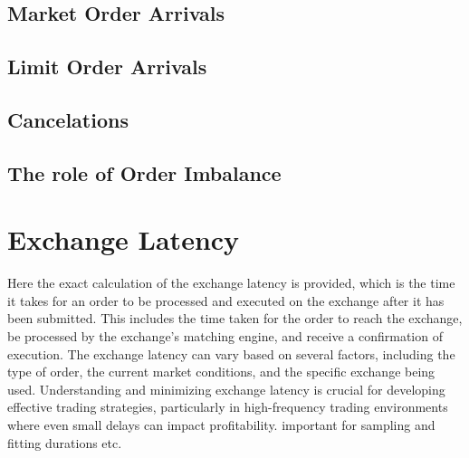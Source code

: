 \documentclass[12pt,a4paper]{cau_thesis}
\begin{document}
\subsection{Market Order Arrivals}\label{sub_sec:mo_arrivals}
\subsection{Limit Order Arrivals}\label{sub_sec:lo_arrivals}
\subsection{Cancelations}\label{sub_sec:cancellations}
\subsection{The role of Order Imbalance}\label{sub_sec:order_imbalance}
\section{Exchange Latency}\label{sec:exchange_latency}
Here the exact calculation of the exchange latency is provided, which
is the time it takes for an order to be processed and executed on the
exchange after it has been submitted. This includes the time taken
for the order to reach the exchange, be processed by the exchange's
matching engine, and receive a confirmation of execution. The
exchange latency can vary based on several factors, including the
type of order, the current market conditions, and the specific
exchange being used. Understanding and minimizing exchange latency is
crucial for developing effective trading strategies, particularly in
high-frequency trading environments where even small delays can
impact profitability. important for sampling and fitting durations
etc.

\end{document}
